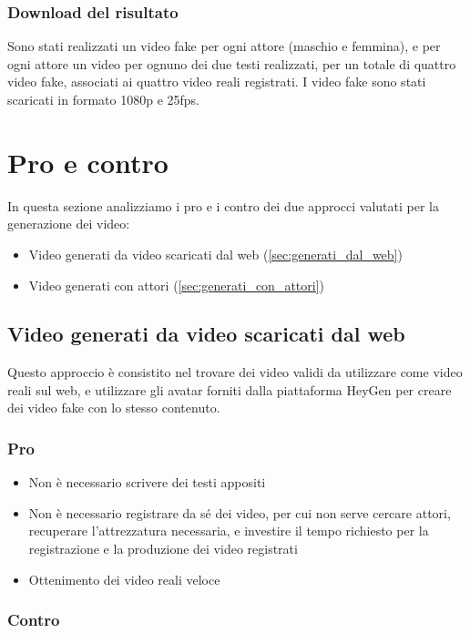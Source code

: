 \subsubsection{Download del risultato}

Sono stati realizzati un video fake per ogni attore (maschio e femmina), e per ogni attore un video per ognuno dei due testi realizzati, per un totale di quattro video fake, associati ai quattro video reali registrati. I video fake sono stati scaricati in formato 1080p e 25fps.

\section{Pro e contro}

In questa sezione analizziamo i pro e i contro dei due approcci valutati per la generazione dei video:
\begin{itemize}
    \item Video generati da video scaricati dal web (\ref{sec:generati_dal_web})
    \item Video generati con attori (\ref{sec:generati_con_attori})
\end{itemize}

\subsection{Video generati da video scaricati dal web}

Questo approccio è consistito nel trovare dei video validi da utilizzare come video reali sul web, e utilizzare gli avatar forniti dalla piattaforma HeyGen per creare dei video fake con lo stesso contenuto.

\subsubsection{Pro}

\begin{itemize}
    \item Non è necessario scrivere dei testi appositi
    \item Non è necessario registrare da sé dei video, per cui non serve cercare attori, recuperare l'attrezzatura necessaria, e investire il tempo richiesto per la registrazione e la produzione dei video registrati
    \item Ottenimento dei video reali veloce
\end{itemize}

\subsubsection{Contro}

